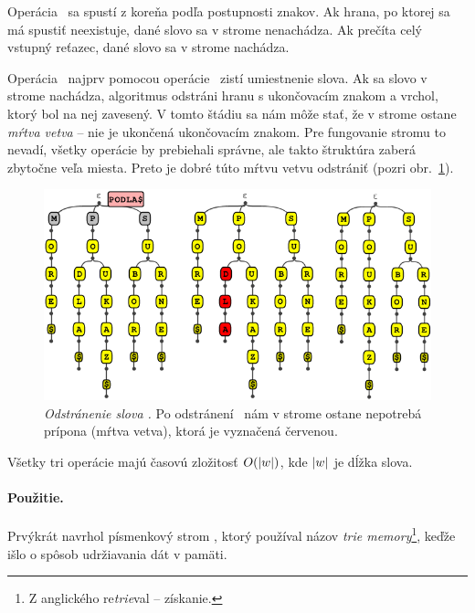 Operácia \find\ sa spustí z koreňa podľa postupnosti znakov. Ak hrana, 
po ktorej sa má spustiť neexistuje, dané slovo sa v strome nenachádza. 
Ak prečíta celý vstupný reťazec, dané slovo sa v strome nachádza.

Operácia \delete\ najprv pomocou operácie \find\ zistí umiestnenie slova. 
Ak sa slovo v strome nachádza, algoritmus odstráni hranu s ukončovacím 
znakom a vrchol, ktorý bol na nej zavesený. V tomto štádiu sa nám môže 
stať, že v strome ostane \emph{mŕtva vetva} -- nie je ukončená 
ukončovacím znakom. Pre fungovanie stromu to nevadí, všetky operácie by 
prebiehali správne, ale takto štruktúra zaberá zbytočne veľa miesta. 
Preto je dobré túto mŕtvu vetvu odstrániť (pozri obr.~\ref{img:triedelete}).

\begin{figure}
\includegraphics[width=\columnwidth]{obrazky/triedeletesmall.png}
\caption{\emph{Odstránenie slova .} Po odstránení 
\uz\ nám v strome ostane nepotrebá prípona  (mŕtva vetva), 
ktorá je vyznačená červenou.}
\label{img:triedelete} 
\end{figure}

\bigskip
Všetky tri operácie majú časovú 
zložitosť $O(|w|)$, kde $|w|$ je dĺžka slova.

\paragraph{Použitie.}
Prvýkrát navrhol písmenkový strom \citet{fredkin}, ktorý používal názov 
\emph{trie memory}\footnote{Z anglického re\emph{trie}val -- získanie.}, 
keďže išlo o spôsob udržiavania dát v pamäti. 


